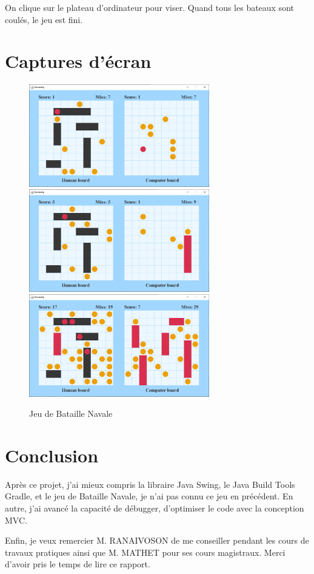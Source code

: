 \documentclass[12pt, pdflatex]{article}
\begin{document}
    On clique sur le plateau d'ordinateur pour viser. Quand tous les bateaux sont coulés, le jeu est fini.


\section{Captures d'écran}
\begin{figure}[H]
    \centering
    \includegraphics[width=0.7\textwidth]{sources/cap-2.png}
    \includegraphics[width=0.7\textwidth]{sources/cap-3.png}
    \includegraphics[width=0.7\textwidth]{sources/cap-4.png}
    \caption{Jeu de Bataille Navale}
\end{figure}


\section{Conclusion}
Après ce projet, j'ai mieux compris la libraire Java Swing, le Java Build Tools Gradle, et le jeu de Bataille Navale, je n'ai pas connu ce jeu en précédent. En autre, j'ai avancé la capacité de débugger, d'optimiser le code avec la conception MVC.

Enfin, je veux remercier M. RANAIVOSON de me conseiller pendant les cours de travaux pratiques ainsi que M. MATHET pour ses cours magistraux. Merci d'avoir pris le temps de lire ce rapport.




\end{document}
